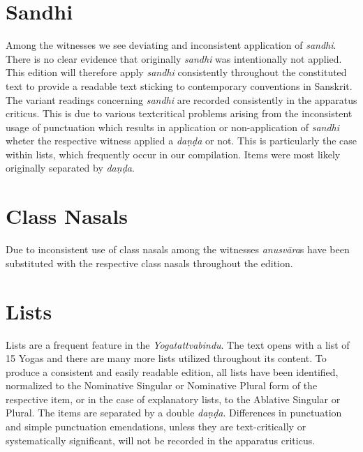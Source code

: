 \section{Sandhi}

Among the witnesses we see deviating and inconsistent application of \textit{sandhi}. There is no clear evidence that originally \textit{sandhi} was intentionally not applied. This edition will therefore apply \textit{sandhi} consistently throughout the constituted text to provide a readable text sticking to contemporary conventions in Sanskrit. The variant readings concerning \textit{sandhi} are recorded consistently in the apparatus criticus. This is due to various textcritical problems arising from the inconsistent usage of punctuation which results in application or non-application of \textit{sandhi} wheter the respective witness applied a \textit{daṇḍa} or not. This is particularly the case within lists, which frequently occur in our compilation. Items were most likely originally separated by \textit{daṇḍa}. 


\section{Class Nasals}

Due to inconsistent use of class nasals among the witnesses \textit{anusvāra}s have been substituted with the respective class nasals throughout the edition.

\section{Lists}

Lists are a frequent feature in the \textit{Yogatattvabindu}. The text opens with a list of 15 Yogas and there are many more lists utilized throughout its content. To produce a consistent and easily readable edition, all lists have been identified, normalized to the Nominative Singular or Nominative Plural form of the respective item, or in the case of explanatory lists, to the Ablative Singular or Plural. The items are separated by a double \textit{daṇḍa}. Differences in punctuation and simple punctuation emendations, unless they are text-critically or systematically significant, will not be recorded in the apparatus criticus.
\clearpage

